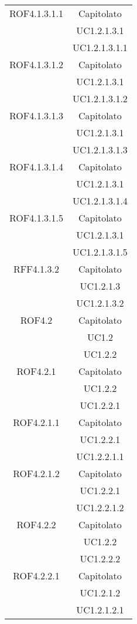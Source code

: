 \begin{longtable}{|c|c|}
\midrule
ROF4.1.3.1.1
& Capitolato\\
& UC1.2.1.3.1\\
& UC1.2.1.3.1.1\\

\midrule
ROF4.1.3.1.2
& Capitolato\\
& UC1.2.1.3.1\\
& UC1.2.1.3.1.2\\

\midrule
ROF4.1.3.1.3
& Capitolato\\
& UC1.2.1.3.1\\
& UC1.2.1.3.1.3\\

\midrule
ROF4.1.3.1.4
& Capitolato\\
& UC1.2.1.3.1\\
& UC1.2.1.3.1.4\\

\midrule
ROF4.1.3.1.5
& Capitolato\\
& UC1.2.1.3.1\\
& UC1.2.1.3.1.5\\

\midrule
RFF4.1.3.2
& Capitolato\\
& UC1.2.1.3\\
& UC1.2.1.3.2\\

\midrule
ROF4.2
& Capitolato\\
& UC1.2\\
& UC1.2.2\\

\midrule
ROF4.2.1
& Capitolato\\
& UC1.2.2\\
& UC1.2.2.1\\

\midrule
ROF4.2.1.1
& Capitolato\\
& UC1.2.2.1\\
& UC1.2.2.1.1\\

\midrule
ROF4.2.1.2
& Capitolato\\
& UC1.2.2.1\\
& UC1.2.2.1.2\\

\midrule
ROF4.2.2
& Capitolato\\
& UC1.2.2\\
& UC1.2.2.2\\

\midrule
ROF4.2.2.1
& Capitolato\\
& UC1.2.1.2\\
& UC1.2.1.2.1\\


\end{longtable}
